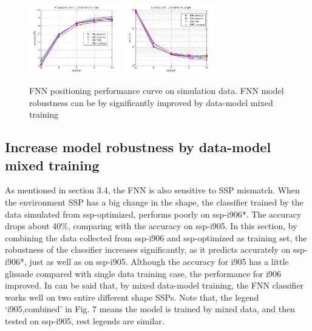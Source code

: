 \begin{figure}
\includegraphics[width=4cm,height=3cm]{figure/Accuracy_to_SNR_Combined_vs_Single}
\includegraphics[width=4cm,height=3cm]{figure/Error_to_SNR_Combined_vs_Single}
\caption{FNN positioning performance curve on simulation data. FNN model robustness can be by significantly improved by data-model mixed training}
\end{figure}

\subsection{%
Increase model robustness by data-model mixed training}
As mentioned in section 3.4, the FNN is also sensitive to SSP mismatch. When the environment SSP has a big change in the shape, the classifier trained by the data simulated from ssp-optimized, performs poorly on ssp-i906{*}. The accuracy drops about 40\%, comparing with the accuracy on ssp-i905. In this section, by combining the data collected from ssp-i906 and ssp-optimized as training set, the robustness of the classifier increases significantly, as it predicts accurately on ssp-i906{*}, just as well as on ssp-i905.
Although the accuracy for i905 has a little glissade compared with single data training case, the performance for i906 improved. In can be said that, by mixed data-model training, the FNN classifier works well on two entire different shape SSPs. Note that, the legend `i905,combined' in Fig. 7 means the model is trained by mixed data, and then tested on ssp-i905, rest legends are similar.
